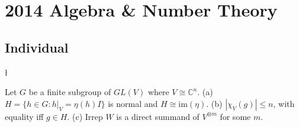 \section{2014 Algebra \& Number Theory}

\subsection*{Individual}
\begin{exercise}
\l\label{2014:1}

\label{algebra:2014:1}Let $G$ be a finite subgroup of $GL(V)$ where $V \cong \mathbb{C}^n$.
(a) $H = \{ h \in G : h|_V = \eta(h) I \}$ is normal and $H \cong \text{im}(\eta)$.
(b) $|\chi_V(g)| \leq n$, with equality iff $g \in H$.
(c) Irrep $W$ is a direct summand of $V^{\otimes m}$ for some $m$.
\end{exercise}

